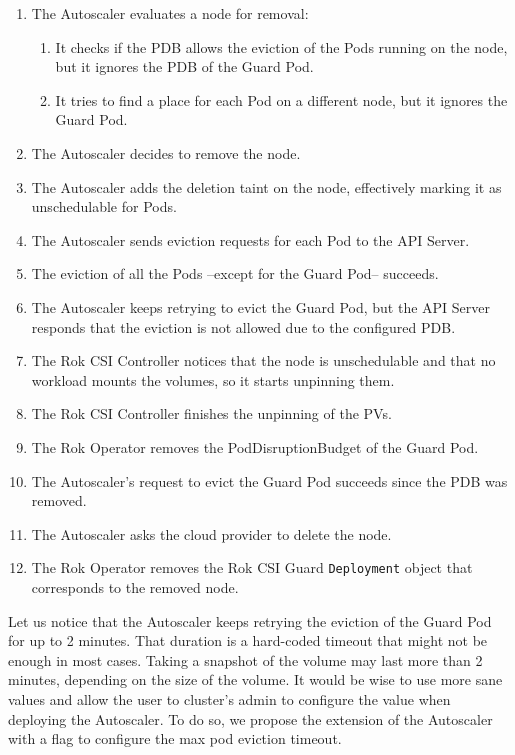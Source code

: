 \begin{enumerate}
      \tightlist
      \item The Autoscaler evaluates a node for removal:
            \begin{enumerate}
                  \item It checks if the PDB allows the eviction of the Pods
                        running on the node, but it ignores the PDB of the Guard
                        Pod.
                  \item It tries to find a place for each Pod on a different
                        node, but it ignores the Guard Pod.
            \end{enumerate}
      \item The Autoscaler decides to remove the node.
      \item The Autoscaler adds the deletion taint on the node, effectively
            marking it as unschedulable for Pods.
      \item The Autoscaler sends eviction requests for each Pod to the API
            Server.
      \item The eviction of all the Pods --except for the Guard Pod-- succeeds.
      \item The Autoscaler keeps retrying to evict the Guard Pod, but the API
            Server responds that the eviction is not allowed due to the
            configured PDB.
      \item The Rok CSI Controller notices that the node is unschedulable and
            that no workload mounts the volumes, so it starts unpinning them.
      \item The Rok CSI Controller finishes the unpinning of the PVs.
      \item The Rok Operator removes the PodDisruptionBudget of the Guard Pod.
      \item The Autoscaler's request to evict the Guard Pod succeeds since the
            PDB was removed.
      \item The Autoscaler asks the cloud provider to delete the node.
      \item The Rok Operator removes the Rok CSI Guard \texttt{Deployment}
            object that corresponds to the removed node.
\end{enumerate}

Let us notice that the Autoscaler keeps retrying the eviction of the Guard Pod
for up to 2 minutes. That duration is a hard-coded timeout that might not be
enough in most cases. Taking a snapshot of the volume may last more than 2
minutes, depending on the size of the volume. It would be wise to use more sane
values and allow the user to cluster's admin to configure the value when
deploying the Autoscaler. To do so, we propose the extension of the Autoscaler
with a flag to configure the max pod eviction timeout.

